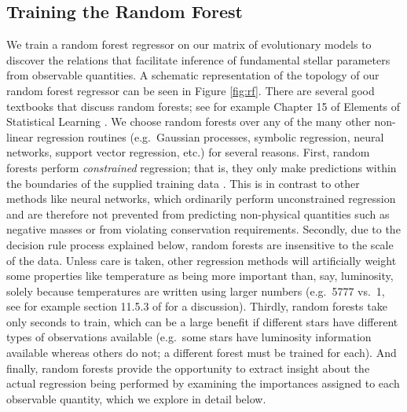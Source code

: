 \documentclass[iop,apj,twocolappendix]{emulateapj}
\begin{document}
\subsection{Training the Random Forest} \label{sec:forest}
We train a random forest regressor on our matrix of evolutionary models to discover the relations that facilitate inference of fundamental stellar parameters from observable quantities. A schematic representation of the topology of our random forest regressor can be seen in Figure \ref{fig:rf}. There are several good textbooks that discuss random forests; see for example Chapter 15 of Elements of Statistical Learning \citep{hastie2005elements}. We choose random forests over any of the many other non-linear regression routines (e.g.\ Gaussian processes, symbolic regression, neural networks, support vector regression, etc.) for several reasons. First, random forests perform \emph{constrained} regression; that is, they only make predictions within the boundaries of the supplied training data \citep[see e.g.\ section 9.2.1 of][]{hastie2005elements}. This is in contrast to other methods like neural networks, which ordinarily perform unconstrained regression and are therefore not prevented from predicting non-physical quantities such as negative masses or from violating conservation requirements. Secondly, due to the decision rule process explained below, random forests are insensitive to the scale of the data. Unless care is taken, other regression methods will artificially weight some properties like temperature as being more important than, say, luminosity, solely because temperatures are written using larger numbers (e.g.\ 5777 vs.\ 1, see for example section 11.5.3 of \citealt{hastie2005elements} for a discussion). Thirdly, random forests take only seconds to train, which can be a large benefit if different stars have different types of observations available (e.g.\ some stars have luminosity information available whereas others do not; a different forest must be trained for each). And finally, random forests provide the opportunity to extract insight about the actual regression being performed by examining the importances assigned to each observable quantity, which we explore in detail below. 
\end{document}
